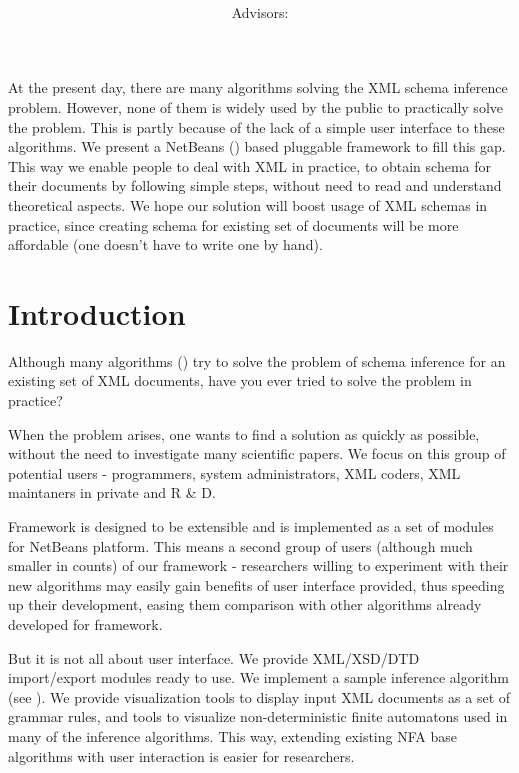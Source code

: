 \documentclass[a4paper,8pt,oneside,twocolumn]{article}
\title{\bf\mftitle}
\author{\mfauthor \\ Advisors: \mfadvisor}
\date{\mfplacedate}
\begin{document}
\maketitle

\abstract
At the present day, there are many algorithms solving the XML schema inference problem.
However, none of them is widely used by the public to practically solve the problem.
This is partly because of the lack of a simple user interface to these algorithms.
We present a NetBeans (\cite{netbeans}) based pluggable framework to fill this gap.
This way we enable people to deal with XML in practice, to obtain schema for their documents by following simple steps, without need to read and understand theoretical aspects.
We hope our solution will boost usage of XML schemas in practice, since creating schema for existing set of documents will be more affordable (one doesn't have to write one by hand).

\section*{Introduction}
Although many algorithms (\cite{ahonen, Bex:2006:ICD:1182635.1164139, Bex:2007:IXS:1325851.1325964, 1802522, vyhnanovska}) 
try to solve the problem of schema inference for an existing set of XML documents, have you ever tried to solve the problem in practice?

When the problem arises, one wants to find a solution as quickly as possible, without the need to investigate many scientific papers.
We focus on this group of potential users - programmers, system administrators, XML coders, XML maintaners in private and R \& D.

Framework is designed to be extensible and is implemented as a set of modules for NetBeans platform.
This means a second group of users (although much smaller in counts) of our framework - researchers willing to experiment with their new algorithms may easily gain benefits of user interface provided, thus speeding up their development, easing them comparison with other algorithms already developed for framework.

But it is not all about user interface.
We provide XML/XSD/DTD import/export modules ready to use.
We implement a sample inference algorithm (see \cite{ahonen}).
We provide visualization tools to display input XML documents as a set of grammar rules, and tools to visualize non-deterministic finite automatons used in many of the inference algorithms.
This way, extending existing NFA base algorithms with user interaction is easier for researchers.
\end{document}
